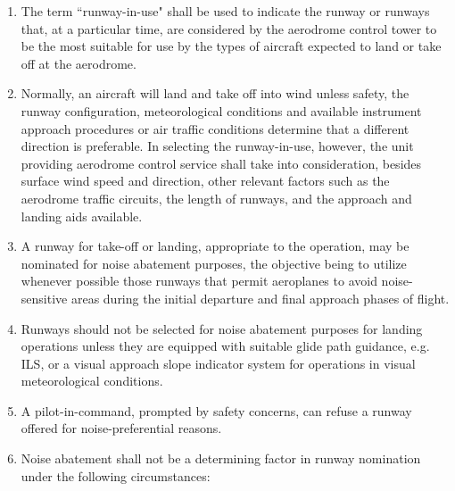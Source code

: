 \begin{enumerate}[label=\arabic{section}.\arabic{subsection}.\arabic*]
    \item The term ``runway-in-use" shall be used to indicate the runway or runways that, at a particular time, are considered by the aerodrome control tower to be the most suitable for use by the types of aircraft expected to land or take off at the aerodrome.
    \item Normally, an aircraft will land and take off into wind unless safety, the runway configuration, meteorological conditions and available instrument approach procedures or air traffic conditions determine that a different direction is preferable. In selecting the runway-in-use, however, the unit providing aerodrome control service shall take into consideration, besides surface wind speed and direction, other relevant factors such as the aerodrome traffic circuits, the length of runways, and the approach and landing aids available.
    \item A runway for take-off or landing, appropriate to the operation, may be nominated for noise abatement purposes, the objective being to utilize whenever possible those runways that permit aeroplanes to avoid noise-sensitive areas during the initial departure and final approach phases of flight.
    \item Runways should not be selected for noise abatement purposes for landing operations unless they are equipped with suitable glide path guidance, e.g. ILS, or a visual approach slope indicator system for operations in visual meteorological conditions.
    \item A pilot-in-command, prompted by safety concerns, can refuse a runway offered for noise-preferential reasons.
    \item Noise abatement shall not be a determining factor in runway nomination under the following circumstances:

\end{enumerate}
